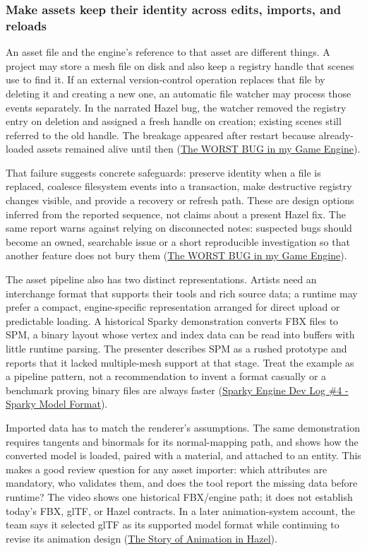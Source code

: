 \subsubsection{Make assets keep their identity across edits, imports, and reloads}\label{06-engine-ii-ch041-make-assets-keep-their-identity-across-edits-imports-and-reloads}

An asset file and the engine's reference to that asset are different things. A project may store a mesh file on disk and also keep a registry handle that scenes use to find it. If an external version-control operation replaces that file by deleting it and creating a new one, an automatic file watcher may process those events separately. In the narrated Hazel bug, the watcher removed the registry entry on deletion and assigned a fresh handle on creation; existing scenes still referred to the old handle. The breakage appeared after restart because already-loaded assets remained alive until then (\href{https://www.youtube.com/watch?v=x5dy8T9dRPk&t=0m3s}{The WORST BUG in my Game Engine}).

That failure suggests concrete safeguards: preserve identity when a file is replaced, coalesce filesystem events into a transaction, make destructive registry changes visible, and provide a recovery or refresh path. These are design options inferred from the reported sequence, not claims about a present Hazel fix. The same report warns against relying on disconnected notes: suspected bugs should become an owned, searchable issue or a short reproducible investigation so that another feature does not bury them (\href{https://www.youtube.com/watch?v=x5dy8T9dRPk&t=4m55s}{The WORST BUG in my Game Engine}).

The asset pipeline also has two distinct representations. Artists need an interchange format that supports their tools and rich source data; a runtime may prefer a compact, engine-specific representation arranged for direct upload or predictable loading. A historical Sparky demonstration converts FBX files to SPM, a binary layout whose vertex and index data can be read into buffers with little runtime parsing. The presenter describes SPM as a rushed prototype and reports that it lacked multiple-mesh support at that stage. Treat the example as a pipeline pattern, not a recommendation to invent a format casually or a benchmark proving binary files are always faster (\href{https://www.youtube.com/watch?v=EUy8G3uMitI&t=3m47s}{Sparky Engine Dev Log \#4 - Sparky Model Format}).

Imported data has to match the renderer's assumptions. The same demonstration requires tangents and binormals for its normal-mapping path, and shows how the converted model is loaded, paired with a material, and attached to an entity. This makes a good review question for any asset importer: which attributes are mandatory, who validates them, and does the tool report the missing data before runtime? The video shows one historical FBX/engine path; it does not establish today's FBX, glTF, or Hazel contracts. In a later animation-system account, the team says it selected glTF as its supported model format while continuing to revise its animation design (\href{https://www.youtube.com/watch?v=HPZo1oFESYQ&t=2m45s}{The Story of Animation in Hazel}).

